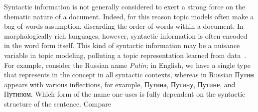 \documentclass[11pt,letterpaper]{article}
\begin{document}
Syntactic information is not generally considered to exert a strong
force on the thematic nature of a document.  Indeed, for this reason
topic models often make a bag-of-words assumption, discarding the order
of words within a document.  In morphologically rich languages,
however, syntactic information is often encoded in the word form
itself.  This kind of syntactic information may be a nuisance variable
in topic modeling, polluting a topic representation
learned from data~\cite{boydgraber2014}.
For example, consider the Russian name
{\em Putin}; in English, we have a single type that represents in the
concept in all syntactic contexts, whereas in Russian
{ Путин} appears with various inflections,
for example, {Путина},
{Путину}, {Путине},
and {Путином}. Which form of the name one uses
is fully dependent on the syntactic structure of the sentence. Compare
\end{document}
